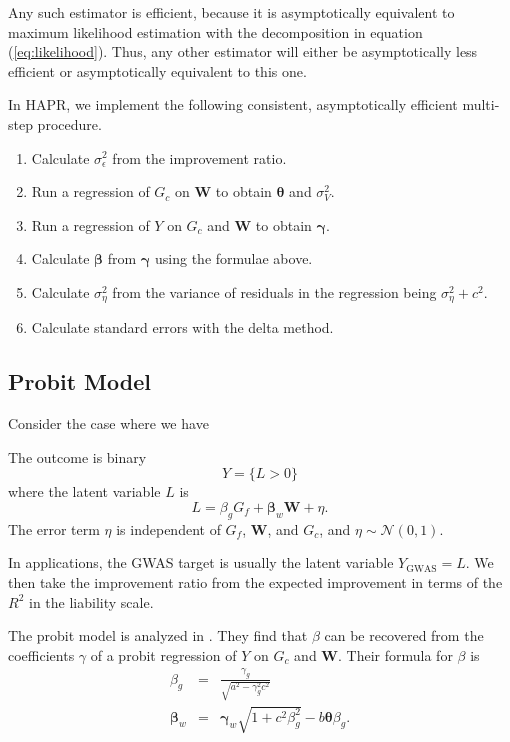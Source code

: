 \documentclass[12pt]{article}
\begin{document}
Any such estimator is efficient, because it is asymptotically equivalent to maximum likelihood estimation with the decomposition in equation (\ref{eq:likelihood}). Thus, any other estimator will either be asymptotically less efficient or asymptotically equivalent to this one.

In HAPR, we implement the following consistent, asymptotically efficient multi-step procedure.
\begin{enumerate}
    \item Calculate $\sigma^2_\epsilon$ from the improvement ratio.
    \item Run a regression of $G_c$ on $\boldsymbol W$ to obtain $\boldsymbol \theta$ and $\sigma^2_V$.
    \item Run a regression of $Y$ on $G_c$ and $\boldsymbol W$ to obtain $\boldsymbol{\gamma}$.
    \item Calculate $\boldsymbol{\beta}$ from $\boldsymbol{\gamma}$ using the formulae above.
    \item Calculate $\sigma^2_\eta$ from the variance of residuals in the regression being $\sigma^2_\eta + c^2$.
    \item Calculate standard errors with the delta method.
\end{enumerate}


\subsection{Probit Model}
Consider the case where we have
\begin{assumption}
    The outcome is binary
    \[
        Y = \{L > 0\}
    \]
    where the latent variable $L$ is
    \[
        L = \beta_g G_f + \boldsymbol{\beta}_w \boldsymbol W + \eta
        \text{.}
    \]
    The error term $\eta$ is independent of $G_f$, $\boldsymbol W$, and $G_c$, and $\eta \sim \mathcal N(0,1)$.
\end{assumption}

In applications, the GWAS target is usually the latent variable $Y_\text{GWAS} = L$. We then take the improvement ratio from the expected improvement in terms of the $R^2$ in the liability scale.

The probit model is analyzed in \textcite{azevedo2024genetic}. They find that $\beta$ can be recovered from the coefficients $\gamma$ of a probit regression of $Y$ on $G_c$ and $\boldsymbol W$. Their formula for $\beta$ is
\begin{eqnarray*}
    \beta_{g}
    &=&
    \frac{\gamma_{g}}{\sqrt{a^2 - \gamma_{g}^2c^2}} \\
    \boldsymbol{\beta}_w
    &=&
    \boldsymbol{\gamma}_{w}\sqrt{1+c^{2}\beta_{g}^{2}}-b\boldsymbol{\theta}\beta_{g}\text{.}
\end{eqnarray*}
\end{document}
